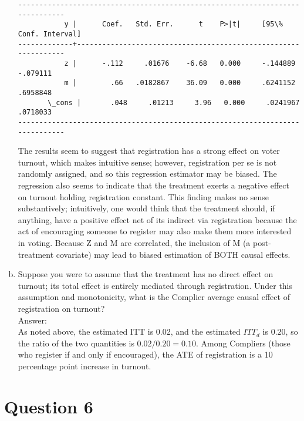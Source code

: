 \documentclass[11pt,notitlepage]{article}\usepackage[]{graphicx}\usepackage[]{color}
\makeatletter
\newenvironment{kframe}{%
 \def\at@end@of@kframe{}%
 \ifinner\ifhmode%
  \def\at@end@of@kframe{\end{minipage}}%
  \begin{minipage}{\columnwidth}%
 \fi\fi%
 \def\FrameCommand##1{\hskip\@totalleftmargin \hskip-\fboxsep
 \colorbox{shadecolor}{##1}\hskip-\fboxsep
     \hskip-\linewidth \hskip-\@totalleftmargin \hskip\columnwidth}%
 \MakeFramed {\advance\hsize-\width
   \@totalleftmargin\z@ \linewidth\hsize
   \@setminipage}}%
 {\par\unskip\endMakeFramed%
 \at@end@of@kframe}
\newenvironment{knitrout}{}{} %
\makeatother
\begin{document}
\begin{enumerate}[a)]
\begin{knitrout}
\begin{kframe}
\begin{Verbatim}[commandchars=\\\{\}]
------------------------------------------------------------------------------
           y |      Coef.   Std. Err.      t    P>|t|     [95\% Conf. Interval]
-------------+----------------------------------------------------------------
           z |      -.112     .01676    -6.68   0.000     -.144889    -.079111
           m |        .66   .0182867    36.09   0.000     .6241152    .6958848
       \_cons |       .048     .01213     3.96   0.000     .0241967    .0718033
------------------------------------------------------------------------------

    \end{Verbatim}

\end{kframe}
\end{knitrout}

The results seem to suggest that registration has a strong effect on voter turnout, which makes intuitive sense; however, registration per se is not randomly assigned, and so this regression estimator may be biased. The regression also seems to indicate that the treatment exerts a negative effect on turnout holding registration constant. This finding makes no sense substantively; intuitively, one would think that the treatment should, if anything, have a positive effect net of its indirect via registration because the act of encouraging someone to register may also make them more interested in voting. Because Z and M are correlated, the inclusion of M (a post-treatment covariate) may lead to biased estimation of BOTH causal effects.

\item Suppose you were to assume that the treatment has no direct effect on turnout; its total effect is entirely mediated through registration. Under this assumption and monotonicity, what is the Complier average causal effect of registration on turnout?\\
Answer:\\
As noted above, the estimated ITT is 0.02, and the estimated $ITT_d$ is $0.20$, so the ratio of the two quantities is $0.02/0.20 = 0.10$.  Among Compliers (those who register if and only if encouraged), the ATE of registration is a 10 percentage point increase in turnout.


\end{enumerate}

\section*{Question 6}
\begin{knitrout}
\color{fgcolor}\begin{kframe}
\begin{verbatim}






\end{verbatim}
\end{kframe}
\end{knitrout}
\end{document}
